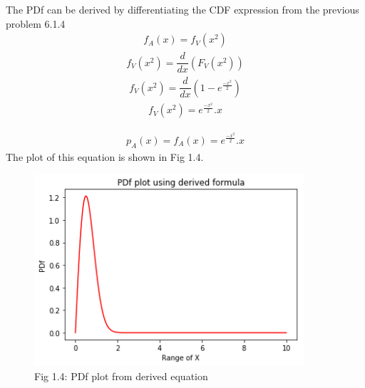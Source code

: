 \documentclass[journal,12pt,twocolumn]{IEEEtran}
\begin{document}
The PDf can be derived by differentiating the CDF expression from the previous problem 6.1.4
\begin{align}f_A(x) = f_V(x^2)\end{align}
\begin{align}f_V(x^2) = \dfrac{d}{dx}(F_V(x^2))\end{align}
\begin{align}f_V(x^2) = \dfrac{d}{dx}(1 - e^\frac{-x^2}{2})\end{align}
\begin{align}f_V(x^2) = e^\frac{-x^2}{2}.x\end{align}
\begin{mdframed}
\begin{align*}p_A(x) = f_A(x) = e^\frac{-x^2}{2}.x\end{align*}
The plot of this equation is shown in Fig 1.4.
\end{mdframed}
\begin{figure}[h!]
    \centering
    \includegraphics[width=10cm]{Assignment-1/Codes/Figures/pdf_actual_Vs_simulate.png}
    \caption*{Fig 1.4: PDf plot from derived equation}
\end{figure}
\newpage
{}
\newline 
{}
\end{document}
